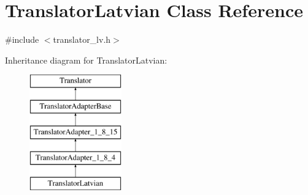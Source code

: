 \hypertarget{class_translator_latvian}{}\section{Translator\+Latvian Class Reference}
\label{class_translator_latvian}


{\ttfamily \#include $<$translator\+\_\+lv.\+h$>$}

Inheritance diagram for Translator\+Latvian\+:\begin{figure}[H]
\begin{center}
\leavevmode
\includegraphics[height=5.000000cm]{class_translator_latvian}
\end{center}
\end{figure}
